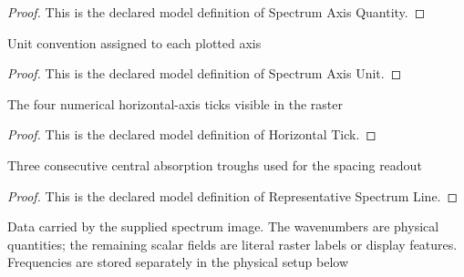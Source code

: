 \begin{proof}
  This is the declared model definition of Spectrum Axis Quantity.
\end{proof}
\begin{definition}
  \label{def:physics:phyx-mini-0605:phyxminiproblems-problemphyxmini0605-spectrumaxisunit}
  Unit convention assigned to each plotted axis
\end{definition}
\begin{proof}
  This is the declared model definition of Spectrum Axis Unit.
\end{proof}
\begin{definition}
  \label{def:physics:phyx-mini-0605:phyxminiproblems-problemphyxmini0605-horizontaltick}
  The four numerical horizontal-axis ticks visible in the raster
\end{definition}
\begin{proof}
  This is the declared model definition of Horizontal Tick.
\end{proof}
\begin{definition}
  \label{def:physics:phyx-mini-0605:phyxminiproblems-problemphyxmini0605-representativespectrumline}
  Three consecutive central absorption troughs used for the spacing readout
\end{definition}
\begin{proof}
  This is the declared model definition of Representative Spectrum Line.
\end{proof}
\begin{definition}
  \label{def:physics:phyx-mini-0605:phyxminiproblems-problemphyxmini0605-carbonmonoxidespectrumfigure}
  Data carried by the supplied spectrum image. The wavenumbers are physical quantities; the remaining scalar fields are literal raster labels or display features. Frequencies are stored separately in the physical setup below
\end{definition}
